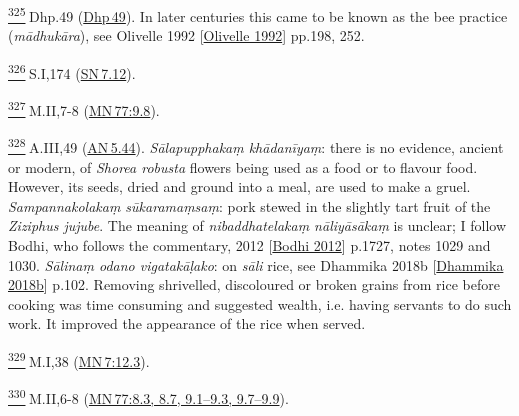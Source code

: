 \label{footprints_split_024.html_fn325}
\hyperref[footprints_split_011.htmlux5cux23fnref325]{\textsuperscript{325}} Dhp.49
(\href{https://suttacentral.net/dhp49/en/sujato}{Dhp\,49}). In later
centuries this came to be known as the bee practice (\emph{mādhukāra}),
see {Olivelle 1992
{{[}\hyperref[footprints_split_022.htmlux5cux23Olivelleux5cux25201992]{Olivelle
1992}{]}}} pp.198, 252.

\label{footprints_split_024.html_fn326}
\hyperref[footprints_split_011.htmlux5cux23fnref326]{\textsuperscript{326}} S.I,174
(\href{https://suttacentral.net/sn7.12/en/sujato}{SN\,7.12}).

\label{footprints_split_024.html_fn327}
\hyperref[footprints_split_011.htmlux5cux23fnref327]{\textsuperscript{327}} M.II,7-8
(\href{https://suttacentral.net/mn77/en/sujato\#9.8}{MN\,77:9.8}).

\label{footprints_split_024.html_fn328}
\hyperref[footprints_split_011.htmlux5cux23fnref328]{\textsuperscript{328}} A.III,49
(\href{https://suttacentral.net/an5.44/en/sujato}{AN\,5.44}).
\emph{Sālapupphakaṃ khādanīyaṃ}: there is no evidence, ancient or
modern, of \emph{Shorea robusta} flowers being used as a food or to
flavour food. However, its seeds, dried and ground into a meal, are used
to make a gruel. \emph{Sampannakolakaṃ sūkaramaṃsaṃ}: pork stewed in the
slightly tart fruit of the \emph{Ziziphus jujube}. The meaning of
\emph{nibaddhatelakaṃ nāliyāsākaṃ} is unclear; I follow Bodhi, who
follows the commentary, {2012
{{[}\hyperref[footprints_split_022.htmlux5cux23Bodhiux5cux25202012]{Bodhi
2012}{]}}} p.1727, notes 1029 and 1030. \emph{Sālinaṃ odano
vigatakāḷako}: on \emph{sāli} rice, see {Dhammika 2018b
{{[}\hyperref[footprints_split_022.htmlux5cux23Dhammikaux5cux25202018b]{Dhammika
2018b}{]}}} p.102. Removing shrivelled, discoloured or broken grains
from rice before cooking was time consuming and suggested wealth, i.e.
having servants to do such work. It improved the appearance of the rice
when served.

\label{footprints_split_024.html_fn329}
\hyperref[footprints_split_011.htmlux5cux23fnref329]{\textsuperscript{329}} M.I,38
(\href{https://suttacentral.net/mn7/en/sujato\#12.3}{MN\,7:12.3}).

\label{footprints_split_024.html_fn330}
\hyperref[footprints_split_011.htmlux5cux23fnref330]{\textsuperscript{330}} M.II,6-8
(\href{https://suttacentral.net/mn77/en/sujato\#8.3}{MN\,77:8.3, 8.7,
9.1--9.3, 9.7--9.9}).


